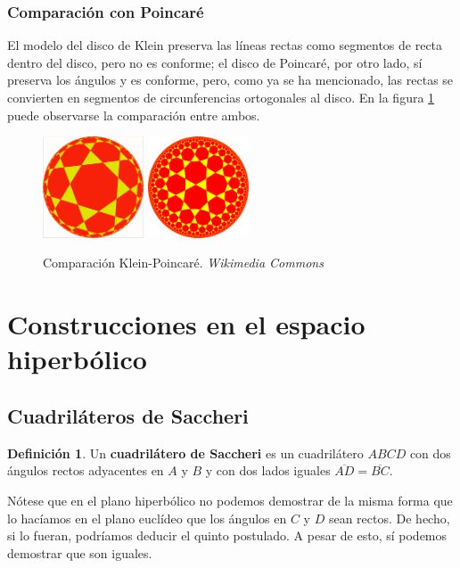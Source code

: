 \documentclass{article}
\theoremstyle{plain}
\theoremstyle{definition}
\newtheorem{definition}{Definición}
\theoremstyle{remark}
\begin{document}
\subsubsection{Comparación con Poincaré}
El modelo del disco de Klein preserva las líneas rectas como segmentos
de recta dentro del disco, pero no es conforme; el disco de Poincaré,
por otro lado, sí preserva los ángulos y es conforme, pero, como ya se
ha mencionado, las rectas se convierten en segmentos de circunferencias
ortogonales al disco. En la figura \ref{kleinpoincare} puede observarse
la comparación entre ambos.

\begin{figure}[ht!]
  \centering
  \includegraphics[width=30mm]{./klein37.png}
  \includegraphics[width=30mm]{./poincare37.png}
  \caption{Comparación Klein-Poincaré. \textit{Wikimedia Commons} \label{kleinpoincare}}
\end{figure}



\section{Construcciones en el espacio hiperbólico}
\subsection{Cuadriláteros de Saccheri}
\begin{definition}
  Un \textbf{cuadrilátero de Saccheri} es un cuadrilátero $ABCD$ con
  dos ángulos rectos adyacentes en $A$ y $B$ y con dos lados iguales
  $\overline{AD} = \overline{BC}$.
\end{definition}

Nótese que en el plano hiperbólico no podemos demostrar de la misma
forma que lo hacíamos en el plano euclídeo que los ángulos en $C$ y
$D$ sean rectos. De hecho, si lo fueran, podríamos deducir el quinto
postulado. A pesar de esto, sí podemos demostrar que son iguales.
\end{document}
